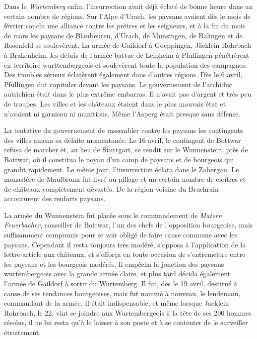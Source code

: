 \documentclass[french,twoside]{book} %
\begin{document}
Dans le \emph{Wurtemberg} enfin, l’insurrection avait déjà éclaté de bonne heure dans un certain nombre de régions. Sur l’Alpe d’Urach, les paysans avaient dès le mois de février conclu une alliance contre les prêtres et les seigneurs, et à la fin du mois de mars les paysans de Blaubeuren, d’Urach, de Munsingen, de Balingen et de Rosenfeld se soulevèrent. La armée de Gaildorf à Goeppingen, Jäcklein Rohrbach à Brakenheim, les débris de l’armée battue de Leipheim à Pfullingen pénétrèrent en territoire wurttembergeois et soulevèrent toute la population des campagnes. Des troubles sérieux éclatèrent également dans d’autres régions. Dès le 6 avril, Pfullingen dut capituler devant les paysans. Le gouvernement de l’archiduc autrichien était dans le plus extrême embarras. Il n’avait pas d’argent et très peu de troupes. Les villes et les châteaux étaient dans le plus mauvais état et n’avaient ni garnison ni munitions. Même l’Asperg était presque sans défense.\par
La tentative du gouvernement de rassembler contre les paysans les contingents des villes amena sa défaite momentanée. Le 16 avril, le contingent de Bottwar refusa de marcher et, au lieu de Stuttgart, se rendit sur le Wunnenstein, près de Bottwar, où il constitua le noyau d’un camp de paysans et de bourgeois qui grandit rapidement. Le même jour, l’insurrection éclata dans le Zabergäu. Le monastère de Maulbronn fut livré au pillage et un certain nombre de cloîtres et de châteaux complètement dévastés. De la région voisine du Bruchrain accoururent des renforts paysans.\par
La armée du Wunnenstein fut placée sous le commandement de \emph{Matern Feuerbacher}, conseiller de Bottwar, l’un des chefs de l’opposition bourgeoise, mais suffisamment compromis pour se voir obligé de faire cause commune avec les paysans. Cependant il resta toujours très modéré, s’opposa à l’application de la lettre-article aux châteaux, et s’efforça en toute occasion de s’entremettre entre les paysans et les bourgeois modérés. Il empêcha la jonction des paysans wurtembergeois avec la grande armée claire, et plus tard décida également l’armée de Gaildorf à sortir du Wurtemberg. Il fut, dès le 19 avril, destitué à cause de ses tendances bourgeoises, mais fut nommé à nouveau, le lendemain, commandant de la armée. Il était indispensable, et même lorsque Jaeklein Rohrbach, le 22, vint se joindre aux Wurtembergeois à la tête de ses 200 hommes résolus, il ne lui resta qu’à le laisser à son poste et à se contenter de le surveiller étroitement.\par
\end{document}
